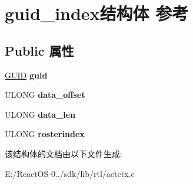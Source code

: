 \hypertarget{structguid__index}{}\section{guid\+\_\+index结构体 参考}
\label{structguid__index}
\subsection*{Public 属性}
\begin{DoxyCompactItemize}
\item 
\mbox{\label{structguid__index_a5e16d2ebcb9695e5d3fde81fd21829a5}} 
\hyperlink{interface_g_u_i_d}{G\+U\+ID} {\bfseries guid}
\item 
\mbox{\label{structguid__index_ab10507efa9688d1c6407f6f22a550cb0}} 
U\+L\+O\+NG {\bfseries data\+\_\+offset}
\item 
\mbox{\label{structguid__index_ad99dd45880ad1a1b1914870bb291236d}} 
U\+L\+O\+NG {\bfseries data\+\_\+len}
\item 
\mbox{\label{structguid__index_ab0ef5f707fc385fa43993ee04d2e4bde}} 
U\+L\+O\+NG {\bfseries rosterindex}
\end{DoxyCompactItemize}


该结构体的文档由以下文件生成\+:\begin{DoxyCompactItemize}
\item 
E\+:/\+React\+O\+S-\/0../sdk/lib/rtl/actctx.\+c\end{DoxyCompactItemize}
